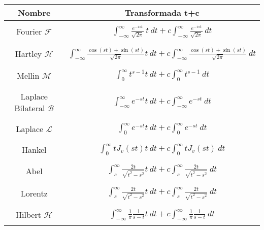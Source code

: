 \documentclass[12pt, a4paper]{article}
\begin{document}
\begin{center}
    \begin{tabular}{c c}
        \toprule
        Nombre & Transformada t+c \\
        \midrule
        \\ Fourier \(\mathcal{F}\) & \( \int_{-\infty}^{\infty} \frac{e^{-ist}}{\sqrt{2\pi}}\ t \ dt + c \int_{-\infty}^{\infty} \frac{e^{-ist}}{\sqrt{2\pi}}\ dt\) \\ \\
        \midrule
        \\ Hartley \(\mathcal{H}\) & \(\int_{-\infty}^{\infty}\frac{\cos{(st)}+\sin{(st)}}{\sqrt{2\pi}} t \ dt + c \int_{-\infty}^{\infty}\frac{\cos{(st)}+\sin{(st)}}{\sqrt{2\pi}} \ dt\) \\ \\
        \midrule
        \\ Mellin \(\mathcal{M}\) & \(\int_{0}^{\infty} t^{s-1} t \ dt + c \int_{0}^{\infty} t^{s-1} \ dt \) \\ \\
        \midrule
        \\ Laplace Bilateral \(\mathcal{B}\) & \(\int_{-\infty}^{\infty} e^{-st} t \ dt + c \int_{-\infty}^{\infty} e^{-st} \ dt\) \\ \\
        \midrule
        \\ Laplace \(\mathcal{L}\) & \(\int_0^{\infty} e^{-st} t \ dt + c \int_0^{\infty} e^{-st} \ dt\) \\ \\
        \midrule
        \\ Hankel & \(\int_0^{\infty} tJ_v(st) t \ dt + c \int_0^{\infty} tJ_v(st) \ dt\) \\ \\
        \midrule
        \\ Abel & \(\int_s^{\infty} \frac{2t}{\sqrt{t^2 - s^2}} t \ dt + c \int_s^{\infty} \frac{2t}{\sqrt{t^2 - s^2}} \ dt\) \\ \\
        \midrule
        \\ Lorentz & \(\int_s^{\infty} \frac{2t}{\sqrt{t^2 - s^2}} t \ dt + c \int_s^{\infty} \frac{2t}{\sqrt{t^2 - s^2}} \ dt\) \\ \\
        \midrule
        \\ Hilbert \(\mathcal{H}\) & \(\int_{-\infty}^{\infty} \frac{1}{\pi}\frac{1}{s-t} t \ dt + c \int_{-\infty}^{\infty} \frac{1}{\pi}\frac{1}{s-t} \ dt\) \\ \\
        \bottomrule
    \end{tabular}
\end{center}
\end{document}
